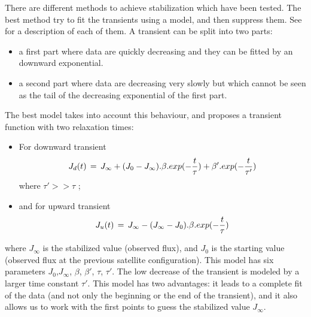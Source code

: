 There are  different methods to achieve stabilization which have
been tested. 
The best  method try to fit the transients using a
model, and then suppress them. See \cite{iso:delattre96} for a description of each of them. A transient can be split into two parts:  
\begin{itemize}
\item a first part where data are quickly decreasing and they can 
be fitted by an downward exponential.
\item a second part where data are decreasing very slowly but which 
cannot be seen as the tail of the decreasing exponential of the first
part.
\end{itemize}
The best model takes into account this behaviour, and proposes a transient
function with two relaxation times:

\begin{itemize}
\item For downward transient
	\[ J_d(t)\,=\,J_{\infty} + (J_0 - J_{\infty}).\beta.exp(- {t \over \tau}) + \beta' . exp(- {t \over \tau'}) \] 
where $\tau' >> \tau$ ;

\item and for upward transient
	\[ J_u(t)\,=\, J_{\infty} - (J_{\infty} - J_0).\beta.exp(- {t \over \tau}) \]
\end{itemize}
where $J_{\infty}$ is the stabilized value (observed flux), and $J_0$ is
the starting value (observed flux at the previous satellite configuration). This model has six parameters $J_0$,$J_{\infty}$, $\beta$, $\beta'$, $\tau$, $\tau'$.
The low decrease of the transient is modeled by a larger time constant
$\tau'$.  This model has two advantages: it leads to a complete fit of
the data (and not only the beginning or the end of the transient), and
it also allows us to work with the first points to guess the
stabilized value $J_{\infty}$.

